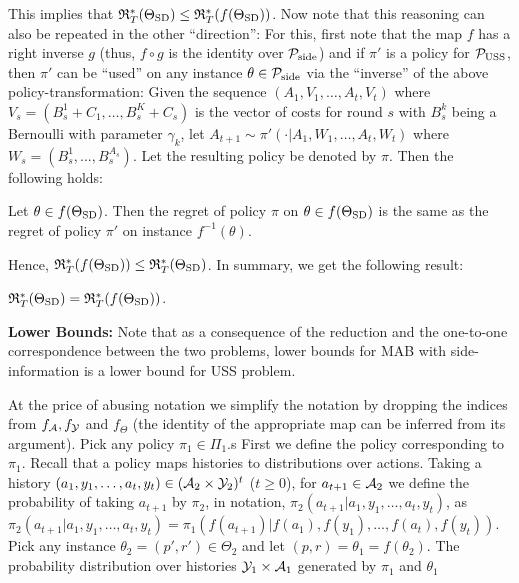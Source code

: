 This implies that $\mathfrak{R}_T^*(\Theta_{\mathrm{SD}})\le \mathfrak{R}_T^*(f(\Theta_{\mathrm{SD}}))$. Now note that this reasoning can also be repeated in the other ``direction'': 
For this, first note that the map $f$ has a right inverse $g$ 
(thus, $f\circ g$ is the identity over $\mathcal{P}_{\mathrm{side}}$)
and if $\pi'$ is a policy for $\mathcal{P}_{\mathrm{USS}}$, 
then $\pi'$ can be ``used''  on any instance $\theta\in \mathcal{P}_{\mathrm{side}}$
via the ``inverse'' of the above policy-transformation:
Given the sequence $(A_1,V_1,\dots,A_t,V_t)$ where 
$V_s= (B_s^1+C_1,\dots,B_ s^{K}+C_s)$ is the vector of costs for round $s$
with $B_s^k$ being a Bernoulli with parameter $\gamma_k$,
let $A_{t+1} \sim \pi'( \cdot| A_1,W_1,\dots,A_t,W_t)$ where
$W_s = (B_s^1,\dots,B_s^{A_s})$. Let the resulting policy be denoted by $\pi$.
Then the following holds:
\begin{prop}
Let $\theta \in f(\Theta_{\mathrm{SD}})$. Then the regret of policy $\pi$ on $\theta\in f(\Theta_{\mathrm{SD}})$ is the same
as the regret of policy $\pi'$ on instance $f^{-1}(\theta)$.
\end{prop}
Hence, $\mathfrak{R}_T^*(f(\Theta_{\mathrm{SD}}))\le \mathfrak{R}_T^*(\Theta_{\mathrm{SD}})$.
In summary, we get the following result:
\begin{cor}
$\mathfrak{R}_T^*(\Theta_{\mathrm{SD}}) = \mathfrak{R}_T^*(f(\Theta_{\mathrm{SD}}))$. 
\end{cor}
{\bf Lower Bounds:} Note that as a consequence of the reduction and the one-to-one correspondence between the two problems, lower bounds for MAB with side-information is a lower bound for USS problem.



At the price of abusing notation 
we simplify the notation by dropping the indices from $f_{\mathcal{A}}, f_{\mathcal{Y}}$ and $f_{\Theta}$ (the identity of the appropriate map can be inferred from its argument).
Pick any policy $\pi_1\in \Pi_1$.s
First we define the policy corresponding to $\pi_1$.
Recall that a policy maps histories to distributions over actions.
Taking a history $(a_1,y_1,\dots,a_t,y_t)\in (\mathcal{A}_2\times \mathcal{Y}_2)^t$ ($t\ge 0$),
for $a_{t+1}\in \mathcal{A}_2$ we define the probability of taking $a_{t+1}$ by $\pi_2$, in notation,
 $\pi_2(a_{t+1}|a_1,y_1,\dots,a_t,y_t)$, as
 $\pi_2(a_{t+1}|a_1,y_1,\dots,a_t,y_t) = \pi_1(f(a_{t+1})|f(a_1),f(y_1),\dots,f(a_t),f(y_t))$.
Pick any instance $\theta_2 = (p',r')\in \Theta_2$ and let $(p,r) = \theta_1  = f( \theta_2)$.
The probability distribution over histories $\mathcal{Y}_1 \times \mathcal{A}_1$ generated by $\pi_1$ and $\theta_1$
\fi



